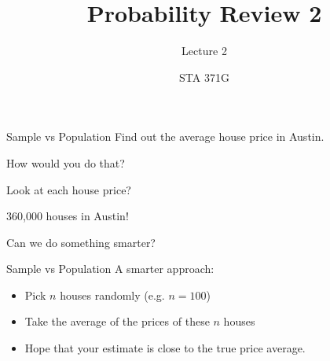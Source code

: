 \documentclass{beamer}\usepackage[]{graphicx}\usepackage[]{color}
\title{Probability Review 2}
\subtitle{Lecture 2}
\author{STA 371G}
\begin{document}
  
  

  \frame{\maketitle}



   \begin{darkframes}
  

	\begin{frame}[label=lists]{Sample vs Population}
    	Find out the average house price in Austin. 
    	
    	How would you do that? 
    	
		\begin{figure} 
			\centering
			\setlength\fboxsep{0pt}
			\setlength\fboxrule{0.5pt}
		\end{figure}  
			
		
		Look at each house price? 
		
		360,000 houses in Austin!  
		
		Can we do something smarter? 
		
     
      
    \end{frame}    
    
    
    
    \begin{frame}[label=lists]{Sample vs Population}
    	A smarter approach:
   		\begin{itemize}
   			\item Pick $n$ houses randomly (e.g. $n=100$)
   			\item Take the average of the prices of these $n$ houses
   			\item Hope that your estimate is close to the true price average.
   		\end{itemize}
   		

\end{frame}
\end{darkframes}
\end{document}
